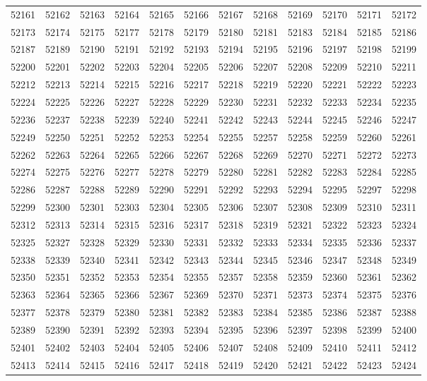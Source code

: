 \begin{center}
\begin{longtable}{llllllllllll}
52161 &52162 &52163 &52164 &52165 &52166 &52167 &52168 &52169 &52170 &52171 &52172 \\
52173 &52174 &52175 &52177 &52178 &52179 &52180 &52181 &52183 &52184 &52185 &52186 \\
52187 &52189 &52190 &52191 &52192 &52193 &52194 &52195 &52196 &52197 &52198 &52199 \\
52200 &52201 &52202 &52203 &52204 &52205 &52206 &52207 &52208 &52209 &52210 &52211 \\
52212 &52213 &52214 &52215 &52216 &52217 &52218 &52219 &52220 &52221 &52222 &52223 \\
52224 &52225 &52226 &52227 &52228 &52229 &52230 &52231 &52232 &52233 &52234 &52235 \\
52236 &52237 &52238 &52239 &52240 &52241 &52242 &52243 &52244 &52245 &52246 &52247 \\
52249 &52250 &52251 &52252 &52253 &52254 &52255 &52257 &52258 &52259 &52260 &52261 \\
52262 &52263 &52264 &52265 &52266 &52267 &52268 &52269 &52270 &52271 &52272 &52273 \\
52274 &52275 &52276 &52277 &52278 &52279 &52280 &52281 &52282 &52283 &52284 &52285 \\
52286 &52287 &52288 &52289 &52290 &52291 &52292 &52293 &52294 &52295 &52297 &52298 \\
52299 &52300 &52301 &52303 &52304 &52305 &52306 &52307 &52308 &52309 &52310 &52311 \\
52312 &52313 &52314 &52315 &52316 &52317 &52318 &52319 &52321 &52322 &52323 &52324 \\
52325 &52327 &52328 &52329 &52330 &52331 &52332 &52333 &52334 &52335 &52336 &52337 \\
52338 &52339 &52340 &52341 &52342 &52343 &52344 &52345 &52346 &52347 &52348 &52349 \\
52350 &52351 &52352 &52353 &52354 &52355 &52357 &52358 &52359 &52360 &52361 &52362 \\
52363 &52364 &52365 &52366 &52367 &52369 &52370 &52371 &52373 &52374 &52375 &52376 \\
52377 &52378 &52379 &52380 &52381 &52382 &52383 &52384 &52385 &52386 &52387 &52388 \\
52389 &52390 &52391 &52392 &52393 &52394 &52395 &52396 &52397 &52398 &52399 &52400 \\
52401 &52402 &52403 &52404 &52405 &52406 &52407 &52408 &52409 &52410 &52411 &52412 \\
52413 &52414 &52415 &52416 &52417 &52418 &52419 &52420 &52421 &52422 &52423 &52424 \\

\end{longtable}
\end{center}
